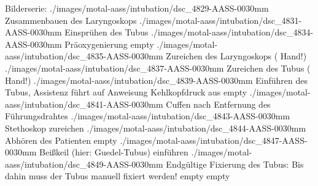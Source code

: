 
\begin{PictureSeriesWide}{}{Bilderserie:  }
{./images/motal-aass/intubation/dsc_4829-AASS-0030mm}
{Zusammenbauen des Laryngoskops}
{./images/motal-aass/intubation/dsc_4831-AASS-0030mm}
{Einsprühen des Tubus }
{./images/motal-aass/intubation/dsc_4834-AASS-0030mm}
{Präoxygenierung}
{empty}
{}
{./images/motal-aass/intubation/dsc_4835-AASS-0030mm}
{Zureichen des Laryngoskops ( Hand!)}
{./images/motal-aass/intubation/dsc_4837-AASS-0030mm}
{Zureichen des Tubus ( Hand!)}
{./images/motal-aass/intubation/dsc_4839-AASS-0030mm}
{Einführen des Tubus, Assistenz führt auf Anweisung Kehlkopfdruck aus}
{empty}
{}
{./images/motal-aass/intubation/dsc_4841-AASS-0030mm}
{Cuffen nach Entfernung des Führungsdrahtes}
{./images/motal-aass/intubation/dsc_4843-AASS-0030mm}
{Stethoskop zureichen}
{./images/motal-aass/intubation/dsc_4844-AASS-0030mm}
{Abhören des Patienten}
{empty}
{}
{./images/motal-aass/intubation/dsc_4847-AASS-0030mm}
{Beißkeil (hier: Guedel-Tubus) einführen}
{./images/motal-aass/intubation/dsc_4849-AASS-0030mm}
{Endgültige Fixierung des Tubus: Bis dahin muss der Tubus manuell fixiert werden!}
{empty}
{}
{empty}
{}
\end{PictureSeriesWide}

\normalfont

\begin{Literary}


\end{Literary}



\nocite{ZechaOpGehilfe1}
\ChapterEnd